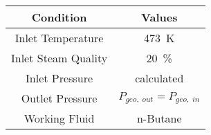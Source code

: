 \begin{tabular}{|c | c |}
    \hline
    \rowcolor{bluepoli!40} %
    \textbf{Condition} & \textbf{Values} \T\B \\
    \hline \hline
    Inlet Temperature & \qty{473}{\K} \T\B \\
    Inlet Steam Quality & \qty{20}{\percent} \T\B \\
    Inlet Pressure & calculated \T\B \\
    Outlet Pressure &  \(P_{geo,\;out} = P_{geo,\;in}\) \T\B \\
    Working Fluid &  n-Butane \T\B \\
    \hline
\end{tabular}